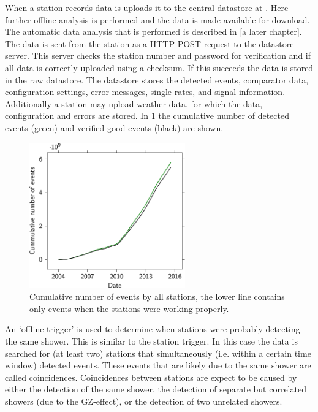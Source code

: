 When a station records data is uploads it to the central datastore at \nikhef. Here further offline analysis is performed and the data is made available for download. The automatic data analysis that is performed is described in [a later chapter]. The data is sent from the station as a HTTP POST request to the datastore server. This server checks the station number and password for verification and if all data is correctly uploaded using a checksum. If this succeeds the data is stored in the raw datastore. The datastore stores the detected events, comparator data, configuration settings, error messages, single rates, and \gps signal information. Additionally a station may upload weather data, for which the data, configuration and errors are stored. In \cref{fig:luminosity_network} the cumulative number of detected events (green) and verified good events (black) are shown.

\begin{figure}
    \centering
    \includegraphics[width=0.6\textwidth]
                    {plots/cluster/luminosity_network}
    \caption{Cumulative number of events by all stations, the lower line contains only events when the stations were working properly.}
    \label{fig:luminosity_network}
\end{figure}

An `offline trigger' is used to determine when stations were probably detecting the same shower. This is similar to the station trigger. In this case the data is searched for (at least two) stations that simultaneously (i.e. within a certain time window) detected events. These events that are likely due to the same shower are called coincidences. Coincidences between stations are expect to be caused by either the detection of the same shower, the detection of separate but correlated showers (due to the GZ-effect), or the detection of two unrelated showers.

